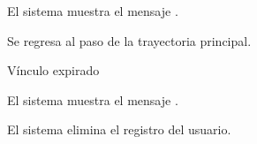 {\begin{trayectoriaAlternativa}
    \item El sistema muestra el mensaje
      .

    \item Se regresa al paso  de la trayectoria
      principal.

  \end{trayectoriaAlternativa}


  \begin{trayectoriaAlternativa}
    {Vínculo expirado}

    \item El sistema muestra el mensaje
      .

    \item El sistema elimina el registro del usuario.

  \end{trayectoriaAlternativa}

}
